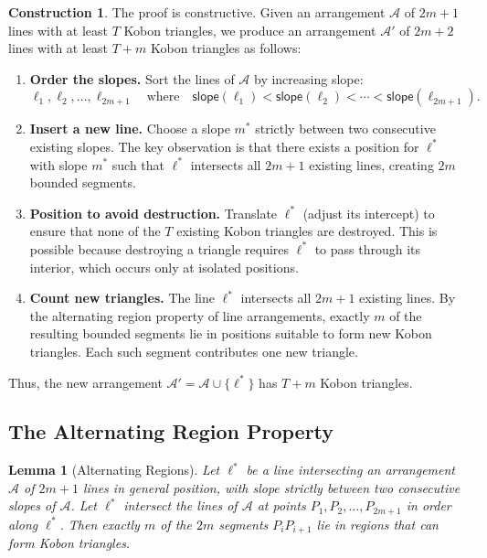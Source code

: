 \documentclass[11pt,a4paper]{article}
\theoremstyle{plain}
\newtheorem{lemma}[theorem]{Lemma}
\theoremstyle{definition}
\newtheorem{construction}[theorem]{Construction}
\theoremstyle{remark}
\begin{document}
\begin{construction}
\label{con:extension}
The proof is constructive. Given an arrangement $\mathcal{A}$ of $2m+1$ lines with at least $T$ Kobon triangles, we produce an arrangement $\mathcal{A}'$ of $2m+2$ lines with at least $T + m$ Kobon triangles as follows:

\begin{enumerate}[label=\textbf{Step \arabic*:}]
\item \textbf{Order the slopes.} Sort the lines of $\mathcal{A}$ by increasing slope:
\[
\ell_1, \ell_2, \ldots, \ell_{2m+1} \quad \text{where} \quad \mathsf{slope}(\ell_1) < \mathsf{slope}(\ell_2) < \cdots < \mathsf{slope}(\ell_{2m+1}).
\]

\item \textbf{Insert a new line.} Choose a slope $m^*$ strictly between two consecutive existing slopes. The key observation is that there exists a position for $\ell^*$ with slope $m^*$ such that $\ell^*$ intersects all $2m+1$ existing lines, creating $2m$ bounded segments.

\item \textbf{Position to avoid destruction.} Translate $\ell^*$ (adjust its intercept) to ensure that none of the $T$ existing Kobon triangles are destroyed. This is possible because destroying a triangle requires $\ell^*$ to pass through its interior, which occurs only at isolated positions.

\item \textbf{Count new triangles.} The line $\ell^*$ intersects all $2m+1$ existing lines. By the alternating region property of line arrangements, exactly $m$ of the resulting bounded segments lie in positions suitable to form new Kobon triangles. Each such segment contributes one new triangle.
\end{enumerate}

Thus, the new arrangement $\mathcal{A}' = \mathcal{A} \cup \{\ell^*\}$ has $T + m$ Kobon triangles.
\end{construction}

\subsection{The Alternating Region Property}

\begin{lemma}[Alternating Regions]
\label{lem:alternating}
Let $\ell^*$ be a line intersecting an arrangement $\mathcal{A}$ of $2m+1$ lines in general position, with slope strictly between two consecutive slopes of $\mathcal{A}$. Let $\ell^*$ intersect the lines of $\mathcal{A}$ at points $P_1, P_2, \ldots, P_{2m+1}$ in order along $\ell^*$. Then exactly $m$ of the $2m$ segments $P_i P_{i+1}$ lie in regions that can form Kobon triangles.
\end{lemma}
\end{document}
